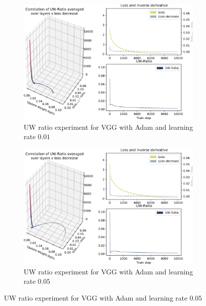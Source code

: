 \begin{figure}
    \begin{subfigure}{\textwidth}
        \centering
        \includegraphics[width=\linewidth]{gfx/diagrams/experiments/ratio_loss_correlation/vgg_adam_001_0_10000.pdf}
        \caption{UW ratio experiment for VGG with Adam and learning rate $0.01$}
        \label{fig:ratio_loss_corr_vgg_adam_001}
    \end{subfigure}

    \begin{subfigure}{\textwidth}
        \centering
        \includegraphics[width=\linewidth]{gfx/diagrams/experiments/ratio_loss_correlation/vgg_adam_005_0_10000.pdf}
        \caption{UW ratio experiment for VGG with Adam and learning rate $0.05$}
        \label{fig:ratio_loss_corr_vgg_adam_005}
    \end{subfigure}


\end{figure}
